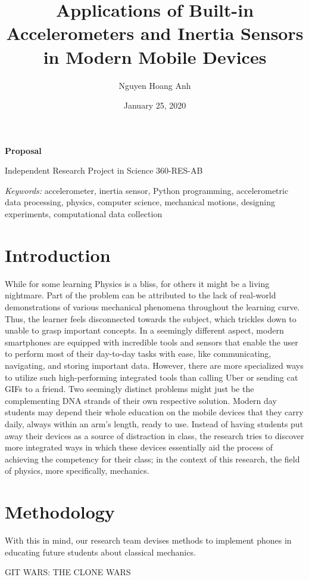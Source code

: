 \documentclass[11pt, a4paper]{article}
\author{Nguyen Hoang Anh}
\affil{John Abbott College, Sainte-Anne-de-Bellevue, Quebec\\ \email{hoanganh.theodore@icloud.com}}
\date{January 25, 2020}
\title{Applications of Built-in Accelerometers and Inertia Sensors in Modern Mobile Devices}
\begin{document}
    \maketitle

    \begin{center}
        \textbf{Proposal}

        Independent Research Project in Science 360-RES-AB       
    \end{center}
    \textit{Keywords:} accelerometer, inertia sensor, Python programming, accelerometric data processing, physics, computer science, mechanical motions, designing experiments, computational data collection

    \section{Introduction}
    While for some learning Physics is a bliss, for others it might be a living nightmare. Part of the problem can be attributed to the lack of real-world demonstrations of various mechanical phenomena throughout the learning curve. Thus, the learner feels disconnected towards the subject, which trickles down to unable to grasp important concepts. In a seemingly different aspect, modern smartphones are equipped with incredible tools and sensors that enable the user to perform most of their day-to-day tasks with ease, like communicating, navigating, and storing important data. However, there are more specialized ways to utilize such high-performing integrated tools than calling Uber or sending cat GIFs to a friend. Two seemingly distinct problems might just be the complementing DNA strands of their own respective solution. Modern day students may depend their whole education on the mobile devices that they carry daily, always within an arm's length, ready to use. Instead of having students put away their devices as a source of distraction in class, the research tries to discover more integrated ways in which these devices essentially aid the process of achieving the competency for their class; in the context of this research, the field of physics, more specifically, mechanics.
    \section{Methodology}
    With this in mind, our research team devises methods to implement phones in educating future students about classical mechanics.
    
    GIT WARS: THE CLONE WARS
\end{document}

